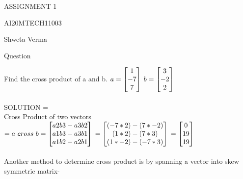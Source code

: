 \documentclass[11pt]{article}
\begin{document}
\begin{center}
\large ASSIGNMENT 1

AI20MTECH11003

Shweta Verma
\end{center}

Question

Find the cross product of a and b.
$
\\
\\
a = \begin{bmatrix}
   1\\
   -7\\
   7\\
\end{bmatrix}
$
$
\\
\\
\\
b = \begin{bmatrix}
  3\\
  -2\\
  2\\
\end{bmatrix}
$
\\
\\
\large SOLUTION =
\\
Cross Product of two vectors 
 $
 = a ~cross~ b
 \\
 \\ 
 =\begin{bmatrix}
  a2b3-a3b2\\
  a1b3-a3b1\\
  a1b2-a2b1\\
 \end{bmatrix}
 \\
 \\
 \\
 =\begin{bmatrix}
  (-7*2)-(7*-2)\\
  (1*2)-(7*3)\\
  (1*-2)-(-7*3)
 \end{bmatrix}
 \\
 \\
 \\
 =\begin{bmatrix}
  0\\
  19\\
  19\\
 \end{bmatrix}
$
\\
\\
Another method to determine cross product is by spanning a vector into skew symmetric matrix-
\\
\end{document}
